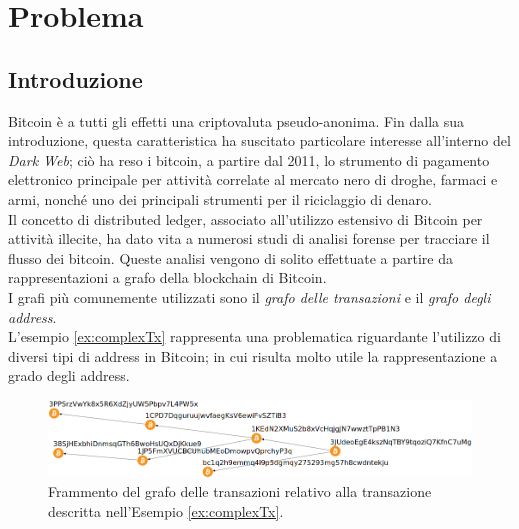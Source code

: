 \chapter{Problema}\label{chap:problema}

\section{Introduzione} \label{sec:problemaIntroduzione}

Bitcoin è a tutti gli effetti una criptovaluta pseudo-anonima. Fin dalla sua introduzione, questa  caratteristica  ha suscitato particolare interesse all’interno del \emph{Dark Web}; ciò ha reso i bitcoin, a partire dal 2011,  lo strumento di pagamento elettronico principale per attività correlate al mercato nero di droghe, farmaci e armi, nonché uno dei principali strumenti per il riciclaggio di denaro.\\
Il concetto di distributed ledger, associato all’utilizzo estensivo di Bitcoin per attività illecite, ha dato vita a numerosi studi di analisi forense per tracciare il flusso dei bitcoin. Queste analisi vengono di solito effettuate a partire da rappresentazioni a grafo della blockchain di Bitcoin.\\
I grafi più comunemente utilizzati sono il \emph{grafo delle transazioni} e il \emph{grafo degli address}.\\
L'esempio \ref{ex:complexTx} rappresenta una problematica riguardante l'utilizzo di diversi tipi di address in Bitcoin; in cui risulta molto utile la rappresentazione a grado degli address.
\begin{figure}
\centering
\includegraphics[scale=0.35]{images/exampleWithGraph/complex-tx.png}
\caption{Frammento del grafo delle transazioni relativo alla  transazione descritta nell’Esempio \ref{ex:complexTx}.\label{fig:complexTx}}
\end{figure}

